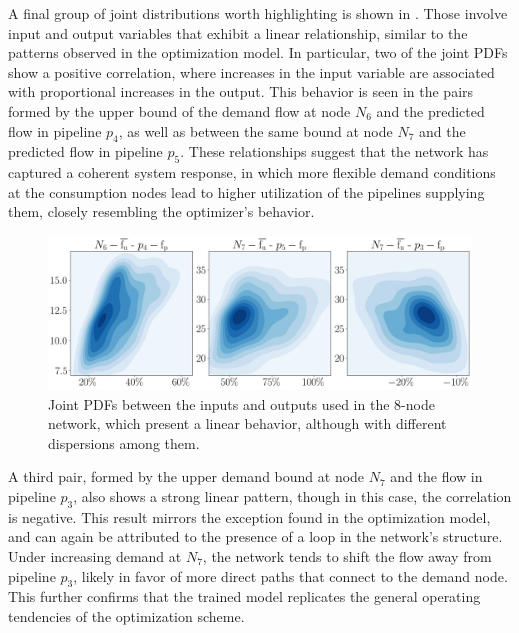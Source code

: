 A final group of joint distributions worth highlighting is shown in . Those involve input and output variables that exhibit a linear relationship, similar to the patterns observed in the optimization model. In particular, two of the joint PDFs show a positive correlation, where increases in the input variable are associated with proportional increases in the output. This behavior is seen in the pairs formed by the upper bound of the demand flow at node $N_6$ and the predicted flow in pipeline $p_4$, as well as between the same bound at node $N_7$ and the predicted flow in pipeline $p_5$. These relationships suggest that the network has captured a coherent system response, in which more flexible demand conditions at the consumption nodes lead to higher utilization of the pipelines supplying them, closely resembling the optimizer’s behavior.


\begin{figure}[htbp]
    \begin{center}
        \includegraphics[width=.7\textwidth]{figures/Chapter_NonLinealCensnet/inputs_outputs_2 KDE.png}
    \end{center}
    \caption{Joint PDFs between the inputs and outputs used in the 8-node network, which present a linear behavior, although with different dispersions among them. }
    \label{fig:joint_distributions_inputs_outputs_2_KDE}
\end{figure}

A third pair, formed by the upper demand bound at node $N_7$ and the flow in pipeline $p_3$, also shows a strong linear pattern, though in this case, the correlation is negative. This result mirrors the exception found in the optimization model, and can again be attributed to the presence of a loop in the network’s structure. Under increasing demand at $N_7$, the network tends to shift the flow away from pipeline $p_3$, likely in favor of more direct paths that connect to the demand node. This further confirms that the trained model replicates the general operating tendencies of the optimization scheme.





